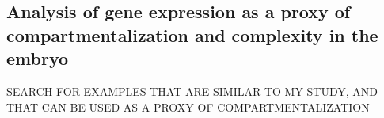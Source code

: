 %

\subsection{Analysis of gene expression as a proxy of compartmentalization and complexity in the embryo}

SEARCH FOR EXAMPLES THAT ARE SIMILAR TO MY STUDY, AND THAT CAN BE USED AS A PROXY OF COMPARTMENTALIZATION 




